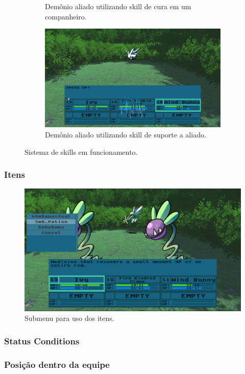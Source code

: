 \documentclass[
	12pt,				%
	openright,			%
	twoside,			%
	a4paper,			%
	english,			%
	french,				%
	spanish,			%
	brazil				%
	]{abntex2}
\begin{document}
\begin{figure}[h!]
\begin{subfigure}[b]{0.49\linewidth}
    \caption{Demônio aliado utilizando skill de cura em um companheiro.}
  \end{subfigure}
  \begin{subfigure}[b]{0.49\linewidth}
    \includegraphics[width=\linewidth]{support.jpg}
    \caption{Demônio aliado utilizando skill de suporte a aliado.}
  \end{subfigure}
  \caption{Sistema de skills em funcionamento.}
  \label{fig:battle2}
\end{figure}

\subsubsection{Itens}

\begin{figure}[h!]
 \centering
  \includegraphics[width=0.5\linewidth]{itemmenu.jpg}
  \caption{Submenu para uso dos itens.}
  \label{fig:itens}
\end{figure}

\subsubsection{Status Conditions}
\subsubsection{Posição dentro da equipe}
\end{document}
